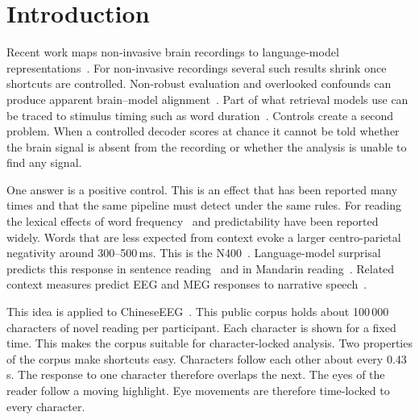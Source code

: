 \documentclass[sigconf]{acmart}
\begin{document}

\maketitle

\section{Introduction}
Recent work maps non-invasive brain recordings to language-model representations~\cite{tang2023semantic,defossez2023decoding}. For non-invasive recordings several such results shrink once shortcuts are controlled. Non-robust evaluation and overlooked confounds can produce apparent brain--model alignment~\cite{hadidi2026spurious}. Part of what retrieval models use can be traced to stimulus timing such as word duration~\cite{zhang2026decoding}. Controls create a second problem. When a controlled decoder scores at chance it cannot be told whether the brain signal is absent from the recording or whether the analysis is unable to find any signal.

One answer is a positive control. This is an effect that has been reported many times and that the same pipeline must detect under the same rules. For reading the lexical effects of word frequency~\cite{zeng2025coregistration} and predictability have been reported widely. Words that are less expected from context evoke a larger centro-parietal negativity around 300--500\,ms. This is the N400~\cite{kutas2011thirty}. Language-model surprisal predicts this response in sentence reading~\cite{frank2015erp} and in Mandarin reading~\cite{salicchi2025metric}. Related context measures predict EEG and MEG responses to narrative speech~\cite{broderick2018semantic,heilbron2022hierarchy}.

This idea is applied to ChineseEEG~\cite{mou2024chineseeeg}. This public corpus holds about 100\,000 characters of novel reading per participant. Each character is shown for a fixed time. This makes the corpus suitable for character-locked analysis. Two properties of the corpus make shortcuts easy. Characters follow each other about every 0.43\,s. The response to one character therefore overlaps the next. The eyes of the reader follow a moving highlight. Eye movements are therefore time-locked to every character.
\end{document}
